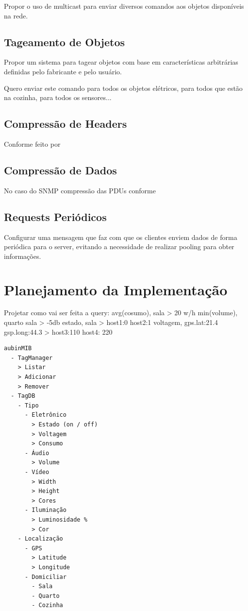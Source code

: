 \documentclass[twoside,english,brazilian]{UNISINOSmonografia}
\begin{document}
		Propor o uso de multicast para enviar diversos comandos aos objetos
		disponíveis na rede.
		
		
	\section{Tageamento de Objetos}
		
		Propor um sistema para tagear objetos com base em características
		arbitrárias definidas pelo fabricante e pelo usuário.
		
		Quero enviar este comando para todos os objetos elétricos, para
		todos que estão na cozinha, para todos os sensores...
		
		
	\section{Compressão de Headers}
		
		Conforme feito por \cite{Choi2009}
		
		
	\section{Compressão de Dados}
		
		No caso do SNMP compressão das PDUs conforme \cite{Choi2009}
		
		
	\section{Requests Periódicos}
		
		Configurar uma mensagem que faz com que os clientes enviem
		dados de forma periódica para o server, evitando a necessidade
		de realizar pooling para obter informações.
		\cite{Choi2009}
		
		
\chapter{Planejamento da Implementação}

Projetar como vai ser feita a query:
avg(cosumo), 	sala 						> 20 w/h
min(volume), 	quarto sala 				> -5db
estado, 		sala 						> host1:0 host2:1
voltagem, 		gps.lat:21.4 gsp.long:44.3 	> host3:110 host4: 220


\begin{verbatim}
aubinMIB
  - TagManager
    > Listar
    > Adicionar
    > Remover
  - TagDB
    - Tipo
      - Eletrônico
        > Estado (on / off)
        > Voltagem
        > Consumo
      - Áudio
        > Volume
      - Vídeo
        > Width
        > Height
        > Cores
      - Iluminação
        > Luminosidade %
        > Cor
    - Localização
      - GPS
        > Latitude
        > Longitude
      - Domiciliar
        - Sala
        - Quarto
        - Cozinha
\end{verbatim}
\end{document}
